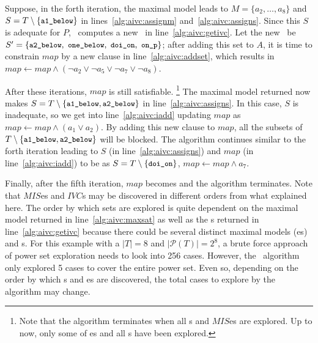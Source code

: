 Suppose, in the forth iteration, the maximal model leads to $M = \{a_2, \ldots, a_8\}$ and 
$S = T \setminus \{\small{\texttt{a1\_below}}\} $ in lines~\ref{alg:aivc:assignm} and~\ref{alg:aivc:assigns}. 
Since this $S$ is adequate for $P$, \getivc ~computes a new \mivc\ in line~\ref{alg:aivc:getivc}.
Let the new \mivc\ be $S' = \{ \small{ \texttt{a2\_below},~\texttt{one\_below}, ~\texttt{doi\_on},~\texttt{on\_p}}\}$; after adding this set to $A$,
it is time to constrain $map$ by a new clause in line~\ref{alg:aivc:addset},
which results in $map \leftarrow map \wedge (\neg a_2 \vee \neg a_5 \vee \neg a_7 \vee \neg a_8)$.

After these iterations, $map$ 
is still satisfiable.
\footnote{Note that the algorithm terminates when all \mivc s and $MIS$es are explored. Up to now, only some of \mis es and all \mivc s have been explored.}
 The maximal model returned now makes 
 $S = T \setminus \{ \small{ \texttt{a1\_below}}, \small{ \texttt{a2\_below}}\}$ in line~\ref{alg:aivc:assigns}.
In this case, $S$ is inadequate, so we get into line~\ref{alg:aivc:iadd} updating $map$ as
$map \leftarrow map \wedge (a_1 \vee a_2)$. By adding this new clause to $map$,
all the subsets of $T \setminus \{ \small{ \texttt{a1\_below}}, \small{ \texttt{a2\_below}}\}$
will be blocked. The algorithm continues similar to the forth iteration leading to $S$ (in line~\ref{alg:aivc:assigns}) and $map$ (in line~\ref{alg:aivc:iadd}) to be as
 $S = T \setminus \{ \small{ \texttt{doi\_on}}\}$, $map \leftarrow map \wedge a_7$.

Finally, after the fifth iteration, $map$ becomes \unsat and the algorithm terminates.
Note that $MIS$es and $IVC$s may be discovered in different orders from what explained here. The order by which sets are explored is
quite dependent on the maximal model returned in line~\ref{alg:aivc:maxsat} as well as the \mivc s returned in line~\ref{alg:aivc:getivc} because there could be several distinct maximal models (\mis es) and \mivc s. For this example with a $|T| = 8$ and $|\mathcal{P}(T)| = 2^8$, a brute force approach of power set exploration needs to look into  256 cases. However, the \aivcalg ~algorithm only explored 5 cases to cover the entire power set. Even so, depending on the order by which \mivc s and \mis es are discovered, the total cases to explore by the algorithm may change.

